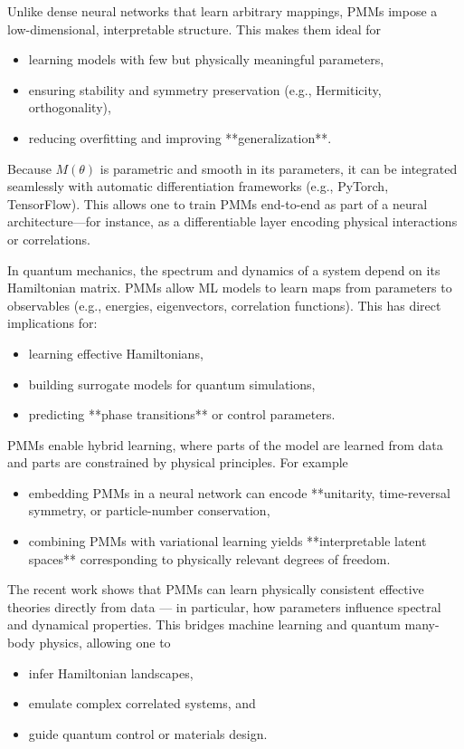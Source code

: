 \documentclass[twocolumn,superscriptaddress,unsortedaddress,nofootinbib,amsmath,amssymb,
aps,floatfix]{revtex4-2}
\begin{document}
Unlike dense neural networks that learn arbitrary mappings, PMMs
impose a low-dimensional, interpretable structure. This makes them
ideal for
\begin{itemize}
\item learning models with few but physically meaningful parameters,
\item ensuring stability and symmetry preservation (e.g., Hermiticity, orthogonality),
\item reducing overfitting and improving **generalization**.
\end{itemize}


Because $M(\theta)$ is parametric and smooth in its parameters, it can
be integrated seamlessly with automatic differentiation frameworks
(e.g., PyTorch, TensorFlow). This allows one to train PMMs end-to-end
as part of a neural architecture—for instance, as a differentiable
layer encoding physical interactions or correlations.

In quantum mechanics, the spectrum and dynamics of a system depend on
its Hamiltonian matrix. PMMs allow ML models to learn maps from
parameters to observables (e.g., energies, eigenvectors, correlation
functions). This has direct implications for:
\begin{itemize}
\item learning effective Hamiltonians,
\item building surrogate models for quantum simulations,
\item predicting **phase transitions** or control parameters.
\end{itemize}

PMMs enable hybrid learning, where parts of the model are learned from
data and parts are constrained by physical principles. For example
\begin{itemize}
\item embedding PMMs in a neural network can encode **unitarity, time-reversal symmetry, or particle-number conservation,
\item combining PMMs with variational learning yields **interpretable latent spaces** corresponding to physically relevant degrees of freedom.
\end{itemize}

The recent work \cite{pmm2025} shows that PMMs can learn physically
consistent effective theories directly from data — in particular, how
parameters influence spectral and dynamical properties.  This bridges
machine learning and quantum many-body physics, allowing one to
\begin{itemize}
\item  infer Hamiltonian landscapes,
\item emulate complex correlated systems, and
\item  guide quantum control or materials design.
\end{itemize}
\end{document}
